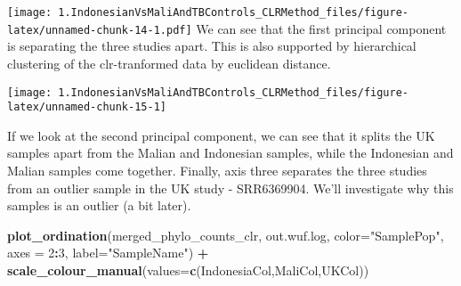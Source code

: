 \documentclass[]{article}
\newenvironment{Shaded}{\begin{snugshade}}{\end{snugshade}}
\newcommand{\CommentTok}[1]{\textcolor[rgb]{0.56,0.35,0.01}{\textit{#1}}}
\newcommand{\DataTypeTok}[1]{\textcolor[rgb]{0.13,0.29,0.53}{#1}}
\newcommand{\DecValTok}[1]{\textcolor[rgb]{0.00,0.00,0.81}{#1}}
\newcommand{\KeywordTok}[1]{\textcolor[rgb]{0.13,0.29,0.53}{\textbf{#1}}}
\newcommand{\NormalTok}[1]{#1}
\newcommand{\OperatorTok}[1]{\textcolor[rgb]{0.81,0.36,0.00}{\textbf{#1}}}
\newcommand{\StringTok}[1]{\textcolor[rgb]{0.31,0.60,0.02}{#1}}
\begin{document}
\texttt{[image: 1.IndonesianVsMaliAndTBControls\_CLRMethod\_files/figure-latex/unnamed-chunk-14-1.pdf]}
We can see that the first principal component is separating the three
studies apart. This is also supported by hierarchical clustering of the
clr-tranformed data by euclidean distance.

\begin{Shaded}
\end{Shaded}

\begin{center}\texttt{[image: 1.IndonesianVsMaliAndTBControls\_CLRMethod\_files/figure-latex/unnamed-chunk-15-1]} \end{center}

If we look at the second principal component, we can see that it splits
the UK samples apart from the Malian and Indonesian samples, while the
Indonesian and Malian samples come together. Finally, axis three
separates the three studies from an outlier sample in the UK study -
SRR6369904. We'll investigate why this samples is an outlier (a bit
later).

\begin{Shaded}
\begin{Highlighting}[]
\KeywordTok{plot_ordination}\NormalTok{(merged_phylo_counts_clr, out.wuf.log, }\DataTypeTok{color=}\StringTok{"SamplePop"}\NormalTok{, }\DataTypeTok{axes =} \DecValTok{2}\OperatorTok{:}\DecValTok{3}\NormalTok{, }\DataTypeTok{label=}\StringTok{"SampleName"}\NormalTok{) }\OperatorTok{+}\StringTok{ }\KeywordTok{scale_colour_manual}\NormalTok{(}\DataTypeTok{values=}\KeywordTok{c}\NormalTok{(IndonesiaCol,MaliCol,UKCol))}
\end{Highlighting}
\end{Shaded}
\end{document}
